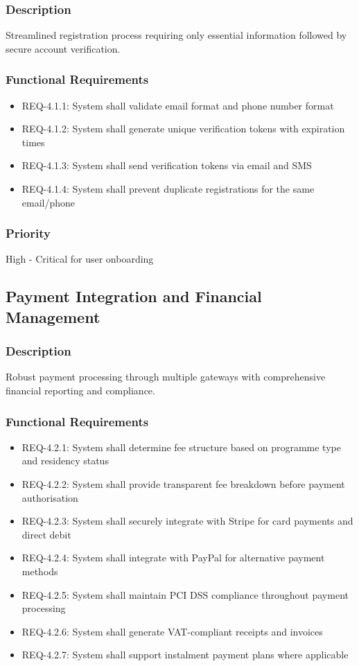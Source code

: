 \documentclass[11pt]{article}
\begin{document}
\subsubsection{Description}
Streamlined registration process requiring only essential information followed by secure account verification.

\subsubsection{Functional Requirements}
\begin{itemize}
    \item REQ-4.1.1: System shall validate email format and phone number format
    \item REQ-4.1.2: System shall generate unique verification tokens with expiration times
    \item REQ-4.1.3: System shall send verification tokens via email and SMS
    \item REQ-4.1.4: System shall prevent duplicate registrations for the same email/phone
\end{itemize}

\subsubsection{Priority}
High - Critical for user onboarding

\subsection{Payment Integration and Financial Management}
\subsubsection{Description}
Robust payment processing through multiple gateways with comprehensive financial reporting and compliance.

\subsubsection{Functional Requirements}
\begin{itemize}
    \item REQ-4.2.1: System shall determine fee structure based on programme type and residency status
    \item REQ-4.2.2: System shall provide transparent fee breakdown before payment authorisation
    \item REQ-4.2.3: System shall securely integrate with Stripe for card payments and direct debit
    \item REQ-4.2.4: System shall integrate with PayPal for alternative payment methods
    \item REQ-4.2.5: System shall maintain PCI DSS compliance throughout payment processing
    \item REQ-4.2.6: System shall generate VAT-compliant receipts and invoices
    \item REQ-4.2.7: System shall support instalment payment plans where applicable
\end{itemize}
\end{document}
